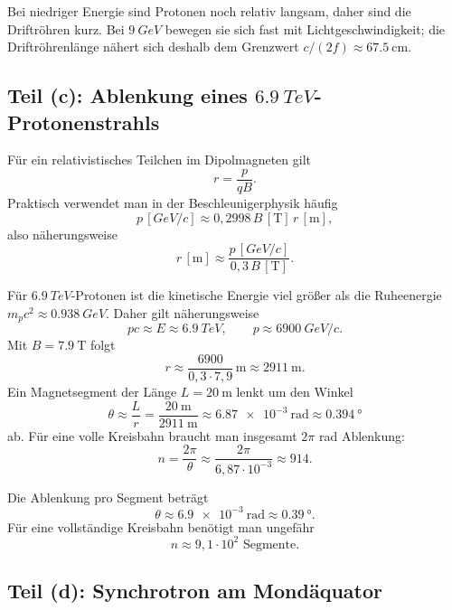 \documentclass[11pt,a4paper]{scrartcl}
\newcommand{\GeV}{\si{GeV}}
\newcommand{\TeV}{\si{TeV}}
\theoremstyle{definition}
\theoremstyle{plain}
\theoremstyle{remark}
\begin{document}
\begin{notebox}[title=Physikalische Interpretation]
Bei niedriger Energie sind Protonen noch relativ langsam, daher sind die Driftröhren kurz. Bei \(\SI{9}{\GeV}\) bewegen sie sich fast mit Lichtgeschwindigkeit; die Driftröhrenlänge nähert sich deshalb dem Grenzwert \(c/(2f)\approx\SI{67,5}{\centi\metre}\).
\end{notebox}

\subsection{Teil (c): Ablenkung eines \(\SI{6,9}{\TeV}\)-Protonenstrahls}

\begin{formulabox}
Für ein relativistisches Teilchen im Dipolmagneten gilt
\[
    r = \frac{p}{qB}.
\]
Praktisch verwendet man in der Beschleunigerphysik häufig
\[
    p\,[\si{\GeV}/c] \approx 0{,}2998\, B\,[\si{\tesla}]\, r\,[\si{\metre}],
\]
also näherungsweise
\[
    r\,[\si{\metre}] \approx \frac{p\,[\si{\GeV}/c]}{0{,}3\,B\,[\si{\tesla}]}.
\]
\end{formulabox}

\begin{calculationbox}
Für \(\SI{6,9}{\TeV}\)-Protonen ist die kinetische Energie viel größer als die Ruheenergie \(m_pc^2\approx\SI{0,938}{\GeV}\). Daher gilt näherungsweise
\[
    pc \approx E \approx \SI{6,9}{\TeV},
    \qquad
    p\approx \SI{6900}{\GeV}/c.
\]
Mit \(B=\SI{7,9}{\tesla}\) folgt
\[
    r \approx \frac{\num{6900}}{0{,}3\cdot 7{,}9}\,\si{\metre}
    \approx \SI{2911}{\metre}.
\]
Ein Magnetsegment der Länge \(L=\SI{20}{\metre}\) lenkt um den Winkel
\[
    \theta \approx \frac{L}{r}
    = \frac{\SI{20}{\metre}}{\SI{2911}{\metre}}
    \approx \SI{6,87e-3}{\radian}
    \approx \SI{0,394}{\degree}
\]
ab.
Für eine volle Kreisbahn braucht man insgesamt \(2\pi\) rad Ablenkung:
\[
    n = \frac{2\pi}{\theta}
    \approx \frac{2\pi}{6{,}87\cdot10^{-3}}
    \approx 914.
\]
\end{calculationbox}

\begin{answerbox}
Die Ablenkung pro Segment beträgt
\[
    \boxed{\theta\approx \SI{6,9e-3}{\radian}\approx\SI{0,39}{\degree}}.
\]
Für eine vollständige Kreisbahn benötigt man ungefähr
\[
    \boxed{n\approx 9{,}1\cdot 10^2\text{ Segmente}}.
\]
\end{answerbox}

\subsection{Teil (d): Synchrotron am Mondäquator}
\end{document}
